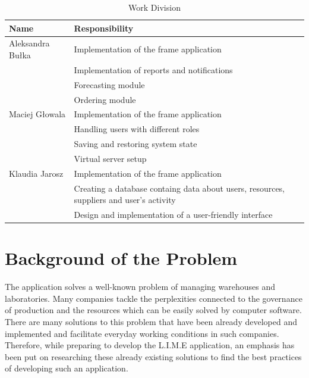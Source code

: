 \documentclass[a4paper,11pt,twoside]{report}
\theoremstyle{definition}
\begin{document}
\begin{table}[!h]%
\caption[Work Division]{Work Division}
\label{division}

\centering
\tabularnewline
\begin{tabular}{|p{4cm}|p{12cm}|}

\hline
\textbf{Name} & \textbf{Responsibility} \\ \hline
Aleksandra Bułka & Implementation of the frame application\\ \cline{2-2}
 & Implementation of reports and notifications\\  \cline{2-2}
 & Forecasting module\\ \cline{2-2}
 & Ordering module \\ \hline
Maciej Głowala & Implementation of the frame application\\ \cline{2-2}
 & Handling users with different roles\\  \cline{2-2}
 & Saving and restoring system state \\ \cline{2-2}
 & Virtual server setup \\ \hline
Klaudia Jarosz & Implementation of the frame application\\ \cline{2-2}
 & Creating a database containg data about users, resources, suppliers and user's activity\\  \cline{2-2}
 & Design and implementation of a user-friendly interface \\ \hline


\end{tabular}
\end{table}




\chapter{Background of the Problem}

The application solves a well-known problem of managing warehouses and laboratories. Many companies tackle the perplexities connected to the governance of production and the resources which can be easily solved by computer software. There are many solutions to this problem that have been already developed and implemented and facilitate everyday working conditions in such companies. Therefore, while preparing to develop the L.I.M.E application, an emphasis has been put on researching these already existing solutions to find the best practices of developing such an application.
\end{document}
